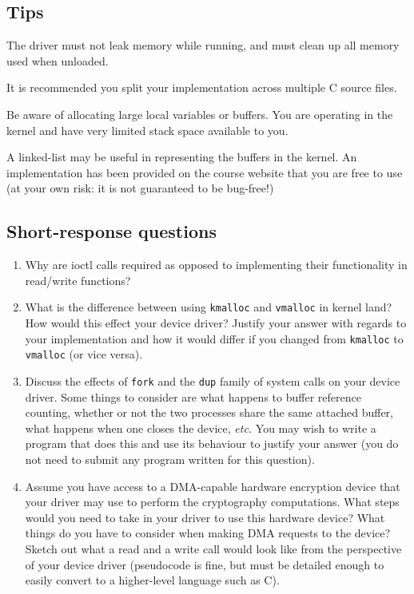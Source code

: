 \documentclass[12pt,a4paper]{article}
\begin{document}
\subsection*{Tips}

\begin{compactitem}
    \item The driver must not leak memory while running, and must clean up all
        memory used when unloaded.
    \item It is recommended you split your implementation across multiple
        C source files.
    \item Be aware of allocating large local variables or buffers. You are operating
        in the kernel and have very limited stack space available to you.
    \item A linked-list may be useful in representing the buffers in the
        kernel. An implementation has been provided on the course website that you
        are free to use (at your own risk: it is not guaranteed to be bug-free!)
\end{compactitem}

\subsection*{Short-response questions}

\begin{enumerate}
    \item Why are ioctl calls required as opposed to implementing their
    functionality in read\slash write functions?

    \item What is the difference between using \texttt{kmalloc} and
    \texttt{vmalloc} in kernel land? How would this effect your device
    driver? Justify your answer with regards to your implementation and how it
    would differ if you changed from \texttt{kmalloc} to \texttt{vmalloc}
    (or vice versa).

    \item Discuss the effects of \texttt{fork} and the \texttt{dup} family
    of system calls on your device driver. Some things to consider are what
    happens to buffer reference counting, whether or not the two processes
    share the same attached buffer, what happens when one closes the device,
    \textit{etc.} You may wish to write a program that does this and use its
    behaviour to justify your answer (you do not need to submit any program
    written for this question).

    \item Assume you have access to a DMA-capable hardware encryption device
    that your driver may use to perform the cryptography computations. What
    steps would you need to take in your driver to use this hardware device?
    What things do you have to consider when making DMA requests to the device?
    Sketch out what a read and a write call would look like from the
    perspective of your device driver (pseudocode is fine, but must be detailed
    enough to easily convert to a higher-level language such as C).
\end{enumerate}
\end{document}
